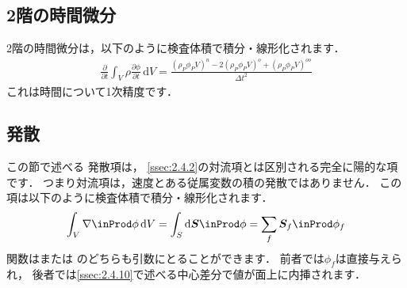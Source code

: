 \subsection{2階の時間微分}
\label{ssec:2.4.4}
%
2階の時間微分は，以下のように検査体積で積分・線形化されます．
\begin{align}
 \label{eq:2.23}
 \frac{\partial}{\partial t}\int_{V}\rho\frac{\partial\phi}{\partial t}\,\mathrm{d}V
 = \frac{(\rho_{P}\phi_{P}V)^{n} - 2(\rho_{P}\phi_{P}V)^{o}
 + (\rho_{P}\phi_{P}V)^{oo}}{\Delta t^{2}}
\end{align}
これは時間について1次精度です．


\subsection{発散}
\label{ssec:2.4.5}
この節で述べる
%  
発散項は，
\autoref{ssec:2.4.2}の対流項とは区別される完全に陽的な項です．
つまり対流項は，速度とある従属変数の積の発散ではありません．
この項は以下のように検査体積で積分・線形化されます．
\begin{align}
 \label{eq:2.24}
 \int_{V}\nabla \inProd \phi\,\mathrm{d}V
 = \int_{S}\mathrm{d}\bm{S} \inProd \phi
 = \sum_{f}\bm{S}_{f} \inProd \phi_{f}
\end{align}
関数はまたは
のどちらも引数にとることができます．
前者では$\phi_{f}$は直接与えられ，
後者では\autoref{ssec:2.4.10}で述べる中心差分で値が面上に内挿されます．


